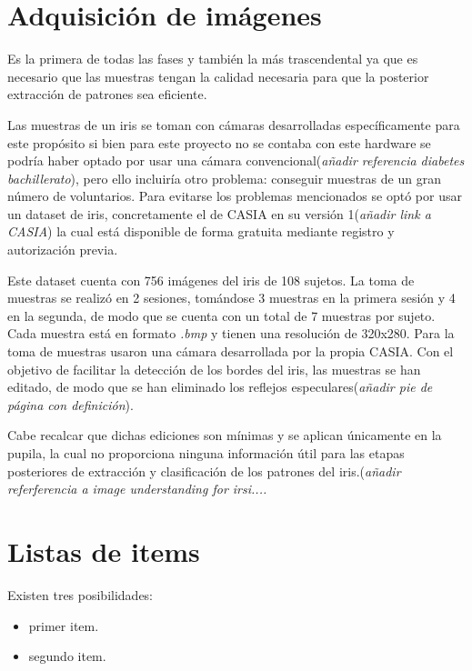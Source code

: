 \section{Adquisición de imágenes}
Es la primera de todas las fases y también la más trascendental ya que es necesario que las muestras tengan la calidad necesaria para que la posterior extracción de patrones sea eficiente.

Las muestras de un iris se toman con cámaras desarrolladas específicamente para este propósito si bien para este proyecto no se contaba con este hardware se podría haber optado por usar una cámara convencional(\emph{añadir referencia diabetes bachillerato}), pero ello incluiría otro problema: conseguir muestras de un gran número de voluntarios.
Para evitarse los problemas mencionados se optó por usar un dataset de iris, concretamente el de CASIA en su versión 1(\emph{añadir link a CASIA}) la cual está disponible de forma gratuita mediante registro y autorización previa.

Este dataset cuenta con 756 imágenes del iris de 108 sujetos. La toma de muestras se realizó en 2 sesiones, tomándose 3 muestras en la primera sesión y 4 en la segunda, de modo que se cuenta con un total de 7 muestras por sujeto.
Cada muestra está en formato \emph{.bmp} y tienen una resolución de 320x280.
Para la toma de muestras usaron una cámara desarrollada por la propia CASIA.
Con el objetivo de facilitar la detección de los bordes del iris, las muestras se han editado, de modo que se han eliminado los reflejos especulares(\emph{añadir pie de página con definición}).

Cabe recalcar que dichas ediciones son mínimas y se aplican únicamente en la pupila, la cual no proporciona ninguna información útil para las etapas posteriores de extracción y clasificación de los patrones del iris.(\emph{añadir referferencia a image understanding for irsi.... }



\section{Listas de items}

Existen tres posibilidades:

\begin{itemize}
	\item primer item.
	\item segundo item.
\end{itemize}

